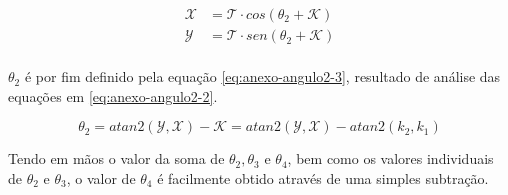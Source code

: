 \begin{align}
    \label{eq:anexo-angulo2-2}
    \mathcal{X} &= \mathcal{T} \cdot cos(\theta_2+\mathcal{K}) \nonumber\\
    \mathcal{Y} &= \mathcal{T} \cdot sen(\theta_2+\mathcal{K}) \nonumber\\
\end{align}

$\theta_2$ é por fim definido pela equação \ref{eq:anexo-angulo2-3}, resultado de análise das equações em 
\ref{eq:anexo-angulo2-2}.

\begin{equation}
    \label{eq:anexo-angulo2-3}
    \theta_2 = atan2(\mathcal{Y}, \mathcal{X}) - \mathcal{K} = atan2(\mathcal{Y}, \mathcal{X}) - atan2(k_2, k_1)
\end{equation}

Tendo em mãos o valor da soma de $\theta_2, \theta_3$ e $\theta_4$, bem como os valores individuais de $\theta_2$ 
e $\theta_3$, o valor de $\theta_4$ é facilmente obtido através de uma simples subtração.